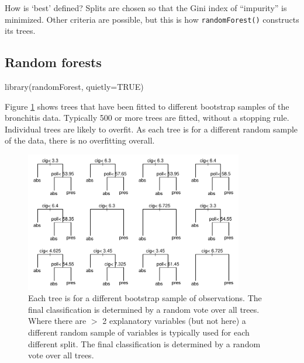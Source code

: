 \documentclass{tufte-book}\usepackage[]{graphicx}\usepackage[]{color}
\newcommand{\txtt}[1]{\texttt{#1}}
\begin{document}
How is `best' defined? Splits are chosen so that the Gini index of
``impurity'' is minimized.  Other criteria are possible, but this is
how \txtt{randomForest()} constructs its trees.

\subsection{Random forests}\label{ss:rf}

\begin{Schunk}
\begin{Sinput}
library(randomForest, quietly=TRUE)
\end{Sinput}
\end{Schunk}

Figure \ref{fig:brontrees} shows trees that have been fitted to
different bootstrap samples of the bronchitis data.  Typically 500 or
more trees are fitted, without a stopping rule.  Individual trees are
likely to overfit.  As each tree is for a different random sample of
the data, there is no overfitting overall.

\begin{figure}
\begin{Schunk}


\centerline{\includegraphics[width=0.85\textwidth]{figs/9-rf-x-bronchit-1} }

\end{Schunk}
\caption{Each tree is for a different bootstrap sample of
  observations.  The final classification is determined by a random
  vote over all trees.  Where there are $>$ 2 explanatory variables
  (but not here) a different random sample of variables is typically
  used for each different split. The final classification is
  determined by a random vote over all trees.}\label{fig:brontrees}
\end{figure}
\end{document}
